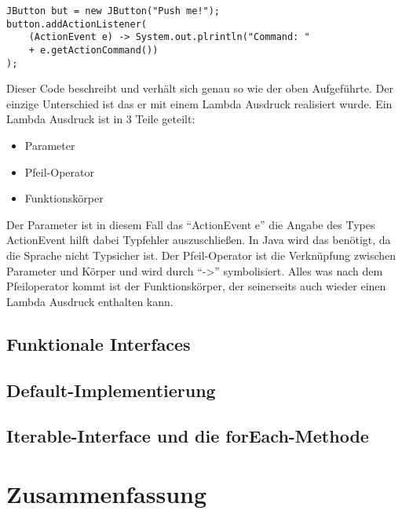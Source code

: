 \pagebreak

\begin{lstlisting}
JButton but = new JButton("Push me!");
button.addActionListener(
	(ActionEvent e) -> System.out.plrintln("Command: " 
	+ e.getActionCommand())
);
\end{lstlisting}
Dieser Code beschreibt und verhält sich genau so wie der oben Aufgeführte. Der
einzige Unterschied ist das er mit einem Lambda Ausdruck realisiert wurde.
Ein Lambda Ausdruck ist in 3 Teile geteilt:
\begin{itemize}
	\item Parameter
	\item Pfeil-Operator
	\item Funktionskörper
\end{itemize}

Der Parameter ist in diesem Fall das "`ActionEvent e"' die Angabe des Types
ActionEvent hilft dabei Typfehler auszuschließen. In Java wird das benötigt, da
die Sprache nicht Typsicher ist. Der Pfeil-Operator ist die Verknüpfung zwischen
Parameter und Körper und wird durch "`->"' symbolisiert. Alles was nach dem
Pfeiloperator kommt ist der Funktionskörper, der seinerseits auch wieder einen
Lambda Ausdruck enthalten kann.

\section{Funktionale Interfaces}
\label{sec:FI}

\section{Default-Implementierung}
\label{sec:DI}

\section{Iterable-Interface und die forEach-Methode}
\label{sec:IIufEM}

\chapter{Zusammenfassung}
\label{sec:Fazit}